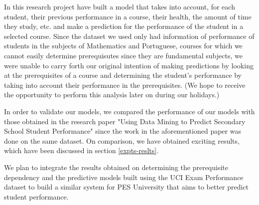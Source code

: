 \documentclass[conference]{IEEEtran}
\begin{document}
In this research project have built a model that takes into account, for each student, their previous performance in a course, their health, the amount of time they study, etc. and make a prediction for the performance of the student in a selected course. Since the dataset we used only had information of performance of students in the subjects of Mathematics and Portuguese, courses for which we cannot easily determine prerequisutes since they are fundamental subjects, we were unable to carry forth our original intention of making predictions by looking at the prerequisites of a course and determining the student's performance by taking into account their performance in the prerequisites. (We hope to receive the opportunity to perform this analysis later on during our holidays.)

In order to validate our models, we compared the performance of our models with those obtained in the research paper "Using Data Mining to Predict Secondary School Student Performance"\cite{ref:4} since the work in the aforementioned paper was done on the same dataset. On comparison, we have obtained exciting results, which have been discussed in section \ref{expts-reslts}.

We plan to integrate the results obtained on determining the prerequisite dependency and the predictive models built using the UCI Exam Performance dataset to build a similar system for PES University that aims to better predict student performance.

\end{document}
